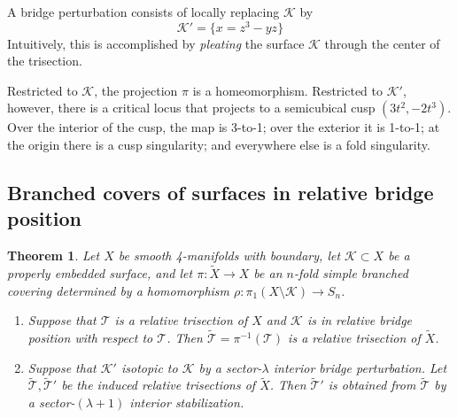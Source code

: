 \documentclass[11pt]{amsart}
\newtheorem{theorem}{Theorem}[section]
\theoremstyle{definition}
\theoremstyle{remark}
\numberwithin{equation}{section}
\newcommand{\cT}{\mathcal{T}}
\newcommand{\cK}{\mathcal{K}}
\begin{document}
A bridge perturbation consists of locally replacing $\cK$ by
\[\cK' = \{ x = z^3 - yz \} \]
Intuitively, this is accomplished by {\it pleating} the surface $\cK$ through the center of the trisection.

Restricted to $\cK$, the projection $\pi$ is a homeomorphism.  Restricted to $\cK'$, however, there is a critical locus that projects to a semicubical cusp $(3t^2,-2t^3)$.  Over the interior of the cusp, the map is 3-to-1; over the exterior it is 1-to-1; at the origin there is a cusp singularity; and everywhere else is a fold singularity.

\subsection{Branched covers of surfaces in relative bridge position}


\begin{theorem}
\label{thrm:bridge-branch-tri}
Let $X$ be smooth 4-manifolds with boundary, let $\cK \subset X$ be a properly embedded surface, and let $\pi: \widetilde{X} \rightarrow X$ be an $n$-fold simple branched covering determined by a homomorphism $\rho: \pi_1(X \setminus \cK) \rightarrow S_n$.

\begin{enumerate}
    \item Suppose that $\cT$ is a relative trisection of $X$ and $\cK$ is in relative bridge position with respect to $\cT$.  Then $\widetilde{\cT} = \pi^{-1}(\cT)$ is a relative trisection of $\widetilde{X}$.
    \item Suppose that $\cK'$ isotopic to $\cK$ by a sector-$\lambda$ interior bridge perturbation.  Let $\widetilde{\cT},\widetilde{\cT}'$ be the induced relative trisections of $\widetilde{X}$.  Then $\widetilde{\cT}'$ is obtained from $\widetilde{\cT}$ by a sector-$(\lambda+1)$ interior stabilization.
    \end{enumerate}
\end{theorem}
\end{document}
